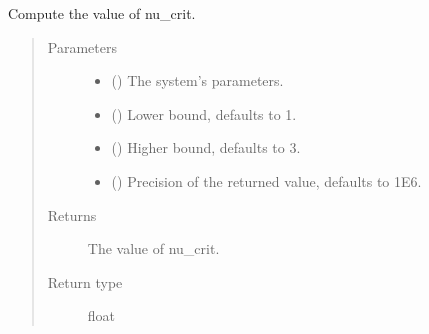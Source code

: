 \documentclass[letterpaper,10pt,english]{sphinxmanual}
\begin{document}

\begin{fulllineitems}
\label{\detokenize{modules:modules.utils.compute_nu_crit}}
\pysigstartsignatures
{}
\pysigstopsignatures
\sphinxAtStartPar
Compute the value of nu\_crit.
\begin{quote}\begin{description}
\item[{Parameters}] \leavevmode\begin{itemize}
\item {} 
\sphinxAtStartPar
{} () \textendash{} The system’s parameters.

\item {} 
\sphinxAtStartPar
{} () \textendash{} Lower bound, defaults to 1.

\item {} 
\sphinxAtStartPar
{} () \textendash{} Higher bound, defaults to 3.

\item {} 
\sphinxAtStartPar
{} () \textendash{} Precision of the returned value, defaults to 1E\sphinxhyphen{}6.

\end{itemize}

\item[{Returns}] \leavevmode
\sphinxAtStartPar
The value of nu\_crit.

\item[{Return type}] \leavevmode
\sphinxAtStartPar
float

\end{description}\end{quote}

\end{fulllineitems}
\end{document}
